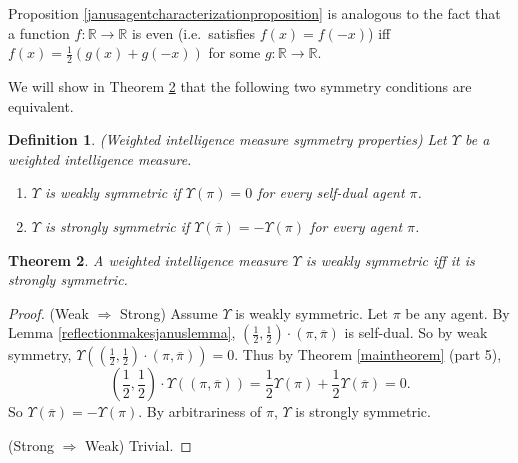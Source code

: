 \documentclass[twoside]{article}
\newtheorem{theorem}{Theorem}
\newtheorem{definition}[theorem]{Definition}
\begin{document}
Proposition \ref{janusagentcharacterizationproposition} is analogous to the
fact that a function $f:\mathbb R\to\mathbb R$ is even
(i.e.\ satisfies $f(x)=f(-x)$)
iff $f(x)=\frac12(g(x)+g(-x))$ for some $g:\mathbb R\to\mathbb R$.

We will show in Theorem \ref{equivalentsymmetriescor} that
the following two symmetry conditions are equivalent.

\begin{definition}
    (Weighted intelligence measure symmetry properties)
    Let $\Upsilon$ be a weighted intelligence measure.
    \begin{enumerate}
        \item $\Upsilon$ is \emph{weakly symmetric} if
            $\Upsilon(\pi)=0$ for every self-dual agent $\pi$.
        \item $\Upsilon$ is \emph{strongly symmetric} if
            $\Upsilon(\overline\pi)=-\Upsilon(\pi)$ for every agent $\pi$.
    \end{enumerate}
\end{definition}

\begin{theorem}
\label{equivalentsymmetriescor}
    A weighted intelligence measure $\Upsilon$ is weakly
    symmetric iff it is strongly symmetric.
\end{theorem}

\begin{proof}
    (Weak $\Rightarrow$ Strong)
    Assume $\Upsilon$ is weakly symmetric.
    Let $\pi$ be any agent.
    By Lemma \ref{reflectionmakesjanuslemma},
    $(\frac12,\frac12)\cdot(\pi,\overline\pi)$ is self-dual.
    So by weak symmetry,
    $\Upsilon((\frac12,\frac12)\cdot(\pi,\overline\pi))=0$.
    Thus by Theorem \ref{maintheorem} (part 5),
    \[
        (\mbox{$\frac12$},\mbox{$\frac12$})\cdot\Upsilon((\pi,\overline\pi))
        =\mbox{$\frac12$}\Upsilon(\pi)+\mbox{$\frac12$}\Upsilon(\overline\pi)=0.
    \]
    So $\Upsilon(\overline{\pi})=-\Upsilon(\pi)$.
    By arbitrariness of $\pi$, $\Upsilon$ is strongly symmetric.

    (Strong $\Rightarrow$ Weak)
    Trivial.
\end{proof}
\end{document}
